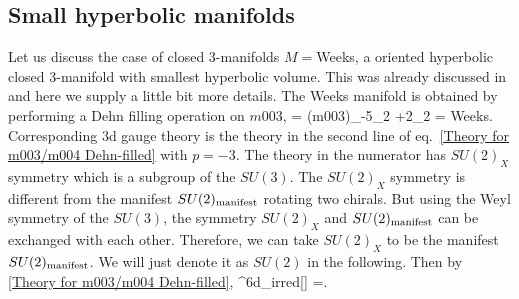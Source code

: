 \documentclass[a4paper,11pt]{article}
\def\beq#1\eeq{\begin{align}#1\end{align}}
\def\alert#1{{\color{red}[#1]}}
\begin{document}
\subsection{Small  hyperbolic manifolds} \label{sec : small-manifolds}
Let us discuss the case of closed 3-manifolds $M=$Weeks, a oriented hyperbolic closed 3-manifold with smallest hyperbolic volume. This was already discussed in \cite{Gang:2017lsr} and here we supply a little bit more details.
The Weeks manifold is obtained by performing a Dehn filling operation on   $m003$,
\beq
\overline{(S^3\backslash \mathbf{5}^2_1)_{5\mu_1 -  \lambda_1, -5 \mu_2 +2 \lambda_2}} = (m003)_{-5\mu_2 +2\lambda_2} = \textrm{Weeks}\;.
\eeq
Corresponding 3d gauge theory is the theory in the second line of eq.~\eqref{Theory for m003/m004 Dehn-filled} with $p=-3$. 
The theory in the numerator has $SU(2)_X$ symmetry which is a subgroup of the $SU(3)$.  The $SU(2)_X$ symmetry is different from the manifest $SU(2)_{\rm manifest}$ rotating two chirals. But using the Weyl symmetry of the $SU(3)$, the symmetry $SU(2)_X$ and $SU(2)_{\rm manifest}$ can be exchanged with each other. Therefore, we can take $SU(2)_X$ to be the manifest $SU(2)_{\rm manifest}$. We will just denote it as $SU(2)$ in the following.
Then by \eqref{Theory for m003/m004 Dehn-filled},
\beq
T^{6d}_{\rm irred}[] =.
\eeq
\end{document}
